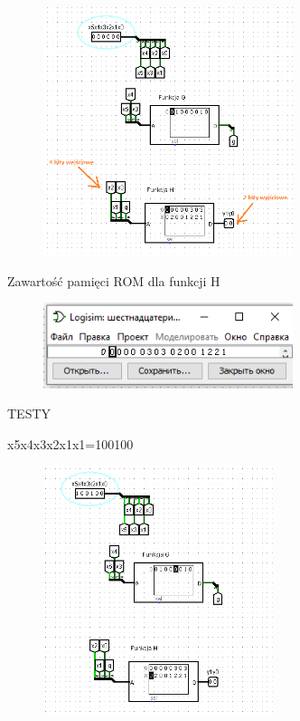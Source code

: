 \documentclass[]{article}
\begin{document}
\begin{figure}[H]
	\centering
	\includegraphics[width=0.65\textwidth]{1.4.png}
\end{figure}
Zawartość pamięci ROM dla funkcji H
\begin{figure}[H]
	\includegraphics[width=0.65\textwidth]{1.5.png}
\end{figure}
\newpage
\begin{center}
    TESTY
\end{center}
x5x4x3x2x1x1=100100
\begin{figure}[H]
	\centering
	\includegraphics[width=0.60\textwidth]{1.6.png}
\end{figure}
\end{document}
